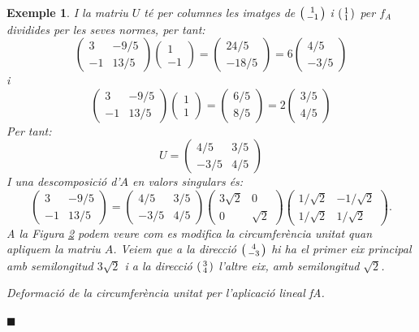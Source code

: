 \documentclass[
  11pt,
]{book}
\numberwithin{dummy}{section}
\theoremstyle{maincolornumbox}
\theoremstyle{blacknumex}
\newtheorem{exampleT}{Exemple}[chapter]
\theoremstyle{blacknumbox}
\theoremstyle{maincolornum}
\newenvironment{example}{\begin{exampleT}}{\hfill{\tiny\ensuremath{\blacksquare}}\end{exampleT}}
\begin{document}
\begin{example}
I la matriu \(U\) té per columnes les imatges de \(\left(\begin{smallmatrix}1\\-1\end{smallmatrix}\right)\) i
\(\left(\begin{smallmatrix}1\\1\end{smallmatrix}\right)\) per \(f_A\) dividides per les seves normes, per tant:
\[\begin{pmatrix}
3 & -9/5 \\ -1 & 13/5
\end{pmatrix} 
\begin{pmatrix}
1 \\ -1 
\end{pmatrix}=
\begin{pmatrix}
24/5 \\ -18/5
\end{pmatrix}=
6 \begin{pmatrix}
4/5 \\ -3/5
\end{pmatrix}\] i \[\begin{pmatrix}
3 & -9/5 \\ -1 & 13/5
\end{pmatrix} 
\begin{pmatrix}
1 \\ 1 
\end{pmatrix}=
\begin{pmatrix}
6/5 \\ 8/5
\end{pmatrix}=
2 \begin{pmatrix}
3/5 \\ 4/5
\end{pmatrix}\] Per tant: \[U=\begin{pmatrix}
4/5 & 3/5 \\ -3/5 & 4/5
\end{pmatrix}\] I una descomposició d'\(A\) en valors singulars és:
\[\begin{pmatrix}
3 & -9/5 \\ -1 & 13/5
\end{pmatrix} 
=\begin{pmatrix}
4/5 & 3/5 \\ -3/5 & 4/5
\end{pmatrix} 
\begin{pmatrix}
3\sqrt{2} & 0 \\ 0 & \sqrt{2}
\end{pmatrix}
\begin{pmatrix}
1/\sqrt{2} & -1/\sqrt{2} \\ 1/\sqrt{2} & 1/\sqrt{2}
\end{pmatrix}.\] A la Figura \protect\hyperlink{fig:circ-ellipse}{2} podem veure com es modifica la
circumferència unitat quan apliquem la matriu \(A\). Veiem que a la
direcció \(\left(\begin{smallmatrix}4\\-3\end{smallmatrix}\right)\) hi ha el primer eix principal amb semilongitud
\(3\sqrt{2}\) i a la direcció \(\left(\begin{smallmatrix}3\\4\end{smallmatrix}\right)\) l'altre eix, amb semilongitud
\(\sqrt{2}\).

Deformació de la circumferència unitat per l'aplicació
lineal {fA}.\protect\hypertarget{fig:circ-ellipse}{}{}

\end{example}
\end{document}
